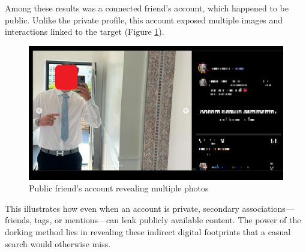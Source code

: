 \documentclass[12pt]{article}
\begin{document}
Among these results was a connected friend’s account, which happened to be public. Unlike the private profile, this account exposed multiple images and interactions linked to the target (Figure \ref{fig:friend}).  

\begin{figure}[H]
    \centering
    \includegraphics[width=0.6\linewidth]{4.png}
    \caption{Public friend’s account revealing multiple photos}
    \label{fig:friend}
\end{figure}

This illustrates how even when an account is private, secondary associations—friends, tags, or mentions—can leak publicly available content. The power of the dorking method lies in revealing these indirect digital footprints that a casual search would otherwise miss.

\clearpage
\listoffigures
\end{document}
